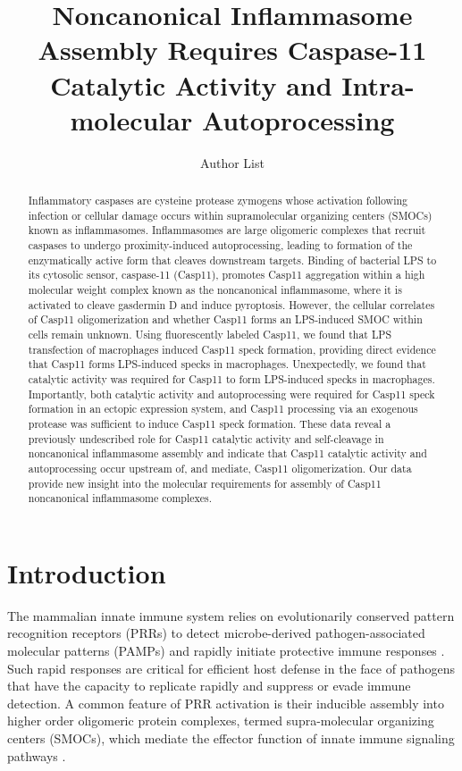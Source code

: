 \documentclass[11pt]{article}
\title{Noncanonical Inflammasome Assembly Requires Caspase-11 Catalytic Activity and Intra-molecular Autoprocessing}
\author{Author List}
\date{}
\begin{document}
\maketitle

\begin{abstract}
Inflammatory caspases are cysteine protease zymogens whose activation following infection or cellular damage occurs within supramolecular organizing centers (SMOCs) known as inflammasomes. Inflammasomes are large oligomeric complexes that recruit caspases to undergo proximity-induced autoprocessing, leading to formation of the enzymatically active form that cleaves downstream targets. Binding of bacterial LPS to its cytosolic sensor, caspase-11 (Casp11), promotes Casp11 aggregation within a high molecular weight complex known as the noncanonical inflammasome, where it is activated to cleave gasdermin D and induce pyroptosis. However, the cellular correlates of Casp11 oligomerization and whether Casp11 forms an LPS-induced SMOC within cells remain unknown. Using fluorescently labeled Casp11, we found that LPS transfection of macrophages induced Casp11 speck formation, providing direct evidence that Casp11 forms LPS-induced specks in macrophages. Unexpectedly, we found that catalytic activity was required for Casp11 to form LPS-induced specks in macrophages. Importantly, both catalytic activity and autoprocessing were required for Casp11 speck formation in an ectopic expression system, and Casp11 processing via an exogenous protease was sufficient to induce Casp11 speck formation. These data reveal a previously undescribed role for Casp11 catalytic activity and self-cleavage in noncanonical inflammasome assembly and indicate that Casp11 catalytic activity and autoprocessing occur upstream of, and mediate, Casp11 oligomerization. Our data provide new insight into the molecular requirements for assembly of Casp11 noncanonical inflammasome complexes.
\end{abstract}

\section{Introduction}

The mammalian innate immune system relies on evolutionarily conserved pattern recognition receptors (PRRs) to detect microbe-derived pathogen-associated molecular patterns (PAMPs) and rapidly initiate protective immune responses \citep{janeway1989approaching,medzhitov2002innate}. Such rapid responses are critical for efficient host defense in the face of pathogens that have the capacity to replicate rapidly and suppress or evade immune detection. A common feature of PRR activation is their inducible assembly into higher order oligomeric protein complexes, termed supra-molecular organizing centers (SMOCs), which mediate the effector function of innate immune signaling pathways \citep{kagan2014smocs}.
\end{document}
